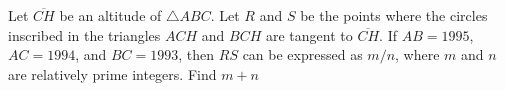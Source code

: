 Let $\overline{CH}$ be an altitude of $\triangle ABC$. Let $R$ and $S$ be the points where the circles inscribed in the triangles $ACH$ and $BCH$ are tangent to $\overline{CH}$. If $AB = 1995$, $AC = 1994$, and $BC = 1993$, then $RS$ can be expressed as $m/n$, where $m$ and $n$ are relatively prime integers. Find $m + n$